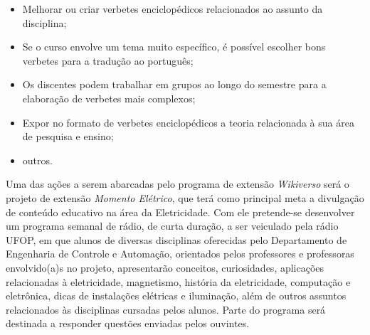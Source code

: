 \documentclass[
	12pt,				%
	openright,			%
	oneside,			%
	a4paper,			%
	english,			%
	brazil				%
	]{abntex2}
\begin{document}
\begin{itemize}
    \item Melhorar ou criar verbetes enciclopédicos relacionados ao assunto da disciplina;
    \item Se o curso envolve um tema muito específico, é possível escolher bons verbetes para a tradução ao português;
    \item Os discentes podem trabalhar em grupos ao longo do semestre para a elaboração de verbetes mais complexos;
    \item Expor no formato de verbetes enciclopédicos a teoria relacionada à sua área de pesquisa e ensino;
    \item outros.
\end{itemize}

Uma das ações a serem abarcadas pelo programa de extensão \textit{Wikiverso} será o projeto de extensão \textit{Momento Elétrico}, que terá como principal meta a divulgação de conteúdo educativo na área da Eletricidade. Com ele pretende-se desenvolver um programa semanal de rádio, de curta duração, a ser veiculado pela rádio UFOP, em que alunos de diversas disciplinas oferecidas pelo Departamento de Engenharia de Controle e Automação, orientados pelos professores e professoras envolvido(a)s no projeto, apresentarão conceitos, curiosidades, aplicações relacionadas à eletricidade, magnetismo, história da eletricidade, computação e eletrônica, dicas de instalações elétricas e iluminação, além de outros assuntos relacionados às disciplinas cursadas pelos alunos. Parte do programa será destinada a responder questões enviadas pelos ouvintes.
\end{document}
